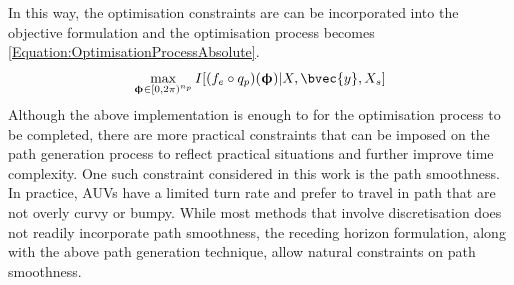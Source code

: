 			In this way, the optimisation constraints are can be incorporated into the objective formulation and the optimisation process becomes \eqref{Equation:OptimisationProcessAbsolute}. \begin{equation}
				\max_{\vec{\upphi} \in [0, 2 \pi)^{n_{p}}} I[(f_{e} \circ q_{p})(\vec{\upphi}) | X, \bvec{y}, X_{s}]				
			\label{Equation:OptimisationProcessAbsolute}
			\end{equation} Although the above implementation is enough to for the optimisation process to be completed, there are more practical constraints that can be imposed on the path generation process to reflect practical situations and further improve time complexity. One such constraint considered in this work is the path smoothness. In practice, AUVs have a limited turn rate and prefer to travel in path that are not overly curvy or bumpy. While most methods that involve discretisation does not readily incorporate path smoothness, the receding horizon formulation, along with the above path generation technique, allow natural constraints on path smoothness.
			
